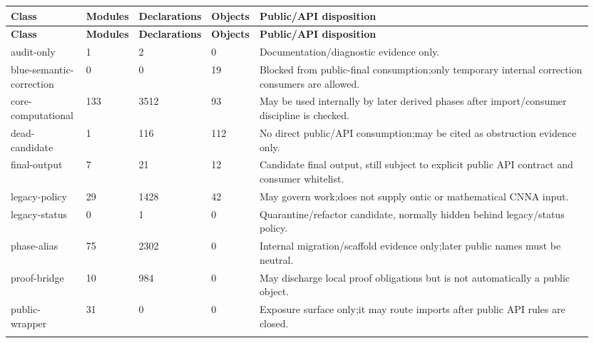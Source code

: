 \footnotesize
{}
\begin{longtable}{L{0.135\linewidth} L{0.06\linewidth} L{0.075\linewidth} L{0.06\linewidth} L{0.62\linewidth}}
\hline
\textbf{Class} & \textbf{Modules} & \textbf{Declarations} & \textbf{Objects} & \textbf{Public/\allowbreak{}API disposition}\\
\hline
\endfirsthead
\hline
\textbf{Class} & \textbf{Modules} & \textbf{Declarations} & \textbf{Objects} & \textbf{Public/\allowbreak{}API disposition}\\
\hline
\endhead
audit-only & 1 & 2 & 0 & Documentation/\allowbreak{}diagnostic evidence only.\\
\hline
\addlinespace[0.24em]
blue-semantic-correction & 0 & 0 & 19 & Blocked from public-final consumption;\newline only temporary internal correction consumers are allowed.\\
\hline
\addlinespace[0.24em]
core-computational & 133 & 3512 & 93 & May be used internally by later derived phases after import/\allowbreak{}consumer discipline is checked.\\
\hline
\addlinespace[0.24em]
dead-candidate & 1 & 116 & 112 & No direct public/\allowbreak{}API consumption;\newline may be cited as obstruction evidence only.\\
\hline
\addlinespace[0.24em]
final-output & 7 & 21 & 12 & Candidate final output, still subject to explicit public API contract and consumer whitelist.\\
\hline
\addlinespace[0.24em]
legacy-policy & 29 & 1428 & 42 & May govern work;\newline does not supply ontic or mathematical CNNA input.\\
\hline
\addlinespace[0.24em]
legacy-status & 0 & 1 & 0 & Quarantine/\allowbreak{}refactor candidate, normally hidden behind legacy/\allowbreak{}status policy.\\
\hline
\addlinespace[0.24em]
phase-alias & 75 & 2302 & 0 & Internal migration/\allowbreak{}scaffold evidence only;\newline later public names must be neutral.\\
\hline
\addlinespace[0.24em]
proof-bridge & 10 & 984 & 0 & May discharge local proof obligations but is not automatically a public object.\\
\hline
\addlinespace[0.24em]
public-wrapper & 31 & 0 & 0 & Exposure surface only;\newline it may route imports after public API rules are closed.\\
\hline
\addlinespace[0.24em]
\end{longtable}
\normalsize
